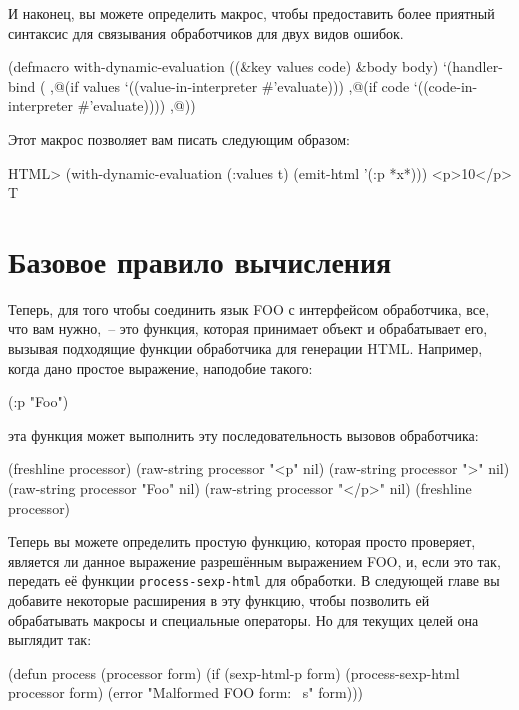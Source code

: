 И наконец, вы можете определить макрос, чтобы предоставить более приятный синтаксис для
связывания обработчиков для двух видов ошибок.

\begin{myverb}
(defmacro with-dynamic-evaluation ((&key values code) &body body)
  `(handler-bind (
       ,@(if values `((value-in-interpreter #'evaluate)))
       ,@(if code `((code-in-interpreter #'evaluate))))
     ,@))
\end{myverb}

Этот макрос позволяет вам писать следующим образом: 

\begin{myverb}
HTML> (with-dynamic-evaluation (:values t) (emit-html '(:p *x*)))
<p>10</p>
T
\end{myverb}


\section{Базовое правило вычисления}

Теперь, для того чтобы соединить язык FOO с интерфейсом обработчика, все, что вам
нужно,~-- это функция, которая принимает объект и обрабатывает его, вызывая подходящие
функции обработчика для генерации HTML. Например, когда дано простое выражение, наподобие
такого:

\begin{myverb}
(:p "Foo")
\end{myverb}

\noindent{}эта функция может выполнить эту последовательность вызовов обработчика:

\begin{myverb}
(freshline processor)
(raw-string processor "<p" nil)
(raw-string processor ">" nil)
(raw-string processor "Foo" nil)
(raw-string processor "</p>" nil)
(freshline processor)
\end{myverb}

Теперь вы можете определить простую функцию, которая просто проверяет, является ли данное
выражение разрешённым выражением FOO, и, если это так, передать её функции
\lstinline{process-sexp-html} для обработки. В следующей главе вы добавите некоторые расширения
в эту функцию, чтобы позволить ей обрабатывать макросы и специальные операторы. Но для
текущих целей она выглядит так:

\begin{myverb}
(defun process (processor form)
  (if (sexp-html-p form)
    (process-sexp-html processor form)
    (error "Malformed FOO form: ~s" form)))
\end{myverb}

